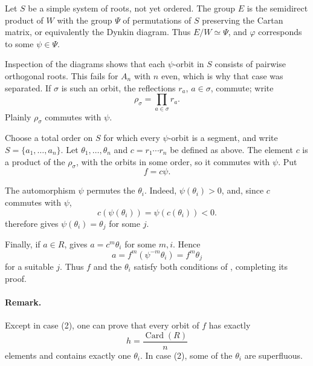 Let \(S\) be a simple system of roots, not yet ordered. The group
\(E\) is the semidirect product of \(W\) with the group
\(\Psi\) of permutations of \(S\) preserving the Cartan matrix,
or equivalently the Dynkin diagram. Thus \(E/W\simeq\Psi\), and
\(\varphi\) corresponds to some \(\psi\in\Psi\).

Inspection of the diagrams shows that each \(\psi\)-orbit in
\(S\) consists of pairwise orthogonal roots. This fails for
\(A_n\) with \(n\) even, which is why that case was separated.
If \(\sigma\) is such an orbit, the reflections \(r_a\),
\(a\in\sigma\), commute; write
\[
  \rho_\sigma=\prod_{a\in\sigma}r_a.
\]
Plainly \(\rho_\sigma\) commutes with \(\psi\).

Choose a total order on \(S\) for which every \(\psi\)-orbit is a
segment, and write \(S=\{a_1,\ldots,a_n\}\). Let
\(\theta_1,\ldots,\theta_n\) and
\(c=r_1\cdots r_n\) be defined as above. The element \(c\) is a
product of the \(\rho_\sigma\), with the orbits in some order, so
it commutes with \(\psi\). Put
\[
  f=c\psi.
\]

The automorphism \(\psi\) permutes the \(\theta_i\). Indeed,
\(\psi(\theta_i)>0\), and, since \(c\) commutes with \(\psi\),
\[
  c(\psi(\theta_i))=\psi(c(\theta_i))<0.
\]
\textup{} therefore gives
\(\psi(\theta_i)=\theta_j\) for some \(j\).

Finally, if \(a\in R\),  gives
\(a=c^m\theta_i\) for some \(m,i\). Hence
\[
  a=f^m(\psi^{-m}\theta_i)=f^m\theta_j
\]
for a suitable \(j\). Thus \(f\) and the \(\theta_i\) satisfy
both conditions of , completing its proof.

\paragraph{\textbf{Remark.}}
Except in case \textup{(2)}, one can prove that every orbit of
\(f\) has exactly
\[
  h=\frac{\operatorname{Card}(R)}{n}
\]
elements and contains exactly one \(\theta_i\). In case
\textup{(2)}, some of the \(\theta_i\) are superfluous.
